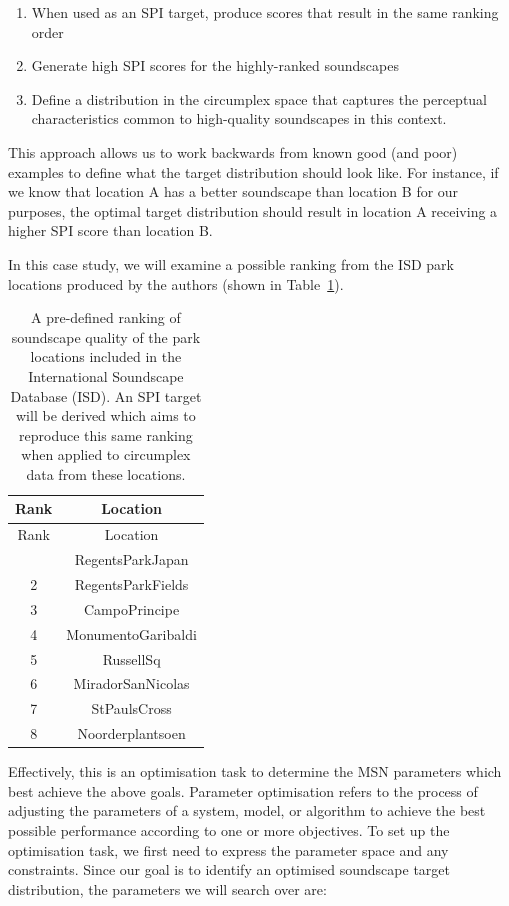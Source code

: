 \documentclass[
  authoryear,
  preprint,
  1p]{elsarticle}
\providecommand{\tightlist}{%
  \setlength{\itemsep}{0pt}\setlength{\parskip}{0pt}}\usepackage{longtable,booktabs,array}
\begin{document}
\begin{enumerate}
\def\labelenumi{\arabic{enumi}.}
\tightlist
\item
  When used as an SPI target, produce scores that result in the same
  ranking order
\item
  Generate high SPI scores for the highly-ranked soundscapes
\item
  Define a distribution in the circumplex space that captures the
  perceptual characteristics common to high-quality soundscapes in this
  context.
\end{enumerate}

This approach allows us to work backwards from known good (and poor)
examples to define what the target distribution should look like. For
instance, if we know that location A has a better soundscape than
location B for our purposes, the optimal target distribution should
result in location A receiving a higher SPI score than location B.

In this case study, we will examine a possible ranking from the ISD park
locations produced by the authors (shown in
Table~\ref{tbl-isd-ranking}).

\begin{longtable}[]{@{}cc@{}}
\caption{A pre-defined ranking of soundscape quality of the park
locations included in the International Soundscape Database (ISD). An
SPI target will be derived which aims to reproduce this same ranking
when applied to circumplex data from these
locations.}\label{tbl-isd-ranking}\tabularnewline
\toprule\noalign{}
Rank & Location \\
\midrule\noalign{}
\endfirsthead
\toprule\noalign{}
Rank & Location \\
\midrule\noalign{}
\endhead
\bottomrule\noalign{}
\endlastfoot
1 & RegentsParkJapan \\
2 & RegentsParkFields \\
3 & CampoPrincipe \\
4 & MonumentoGaribaldi \\
5 & RussellSq \\
6 & MiradorSanNicolas \\
7 & StPaulsCross \\
8 & Noorderplantsoen \\
\end{longtable}

Effectively, this is an optimisation task to determine the MSN
parameters which best achieve the above goals. Parameter optimisation
refers to the process of adjusting the parameters of a system, model, or
algorithm to achieve the best possible performance according to one or
more objectives. To set up the optimisation task, we first need to
express the parameter space and any constraints. Since our goal is to
identify an optimised soundscape target distribution, the parameters we
will search over are:
\end{document}
